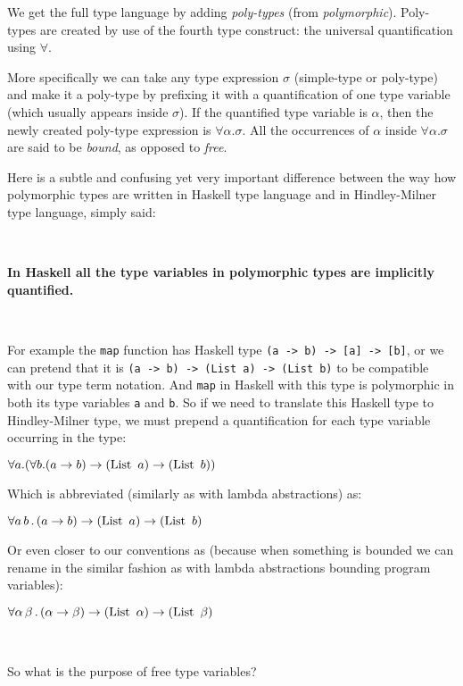 \documentclass[a4paper,oneside]{memoir}
\begin{document}
We get the full type language by adding \textit{poly-types} (from \textit{polymorphic}). Poly-types  are created by use of the fourth type construct: the universal quantification using $\forall$. 

More specifically we can take any type expression $\sigma$ (simple-type or poly-type) and make 
it a poly-type by prefixing it with a quantification of one type variable (which usually appears inside $\sigma$). If the quantified type variable is $\alpha$, then the newly created poly-type expression is $\forall \alpha . \sigma$. All the occurrences of $\alpha$ inside $\forall \alpha . \sigma$ are said to be \textit{bound}, as opposed to \textit{free}.


Here is a subtle and confusing yet very important difference between the way how polymorphic types 
are written in Haskell type language and in Hindley-Milner type language, simply said:

~

\textbf{In Haskell all the type variables in polymorphic types are implicitly quantified.} 

~

For example the \texttt{map} function has Haskell type \texttt{(a -> b) -> [a] -> [b]},
or we can pretend that it is \texttt{(a -> b) -> (List a) -> (List b)} to be compatible with our type term notation.
And \texttt{map} in Haskell with this type is polymorphic in both its type variables \texttt{a}
and \texttt{b}. So if we need to translate this Haskell type to Hindley-Milner type, we must prepend a quantification for each type variable occurring in the type:

$\forall a . (\forall b . (a \rightarrow b) \rightarrow (\operatorname{List}~a) \rightarrow (\operatorname{List}~b))$

Which is abbreviated (similarly as with lambda abstractions) as:

$\forall a\,b\,.\,(a \rightarrow b) \rightarrow (\operatorname{List}~a) \rightarrow (\operatorname{List}~b)$

Or even closer to our conventions as (because when something is bounded we can rename in the similar fashion as with lambda abstractions bounding program variables):

$\forall \alpha\,\beta\,.\,(\alpha \rightarrow \beta) \rightarrow (\operatorname{List}~\alpha) \rightarrow (\operatorname{List}~\beta)$

~

So what is the purpose of free type variables?
\end{document}
